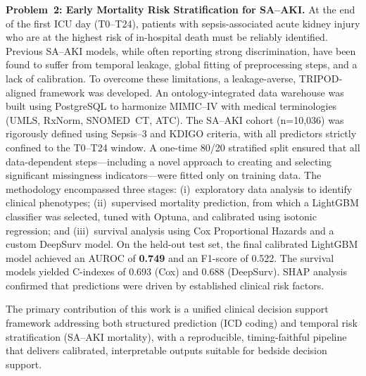 \begin{doublespacing}
\textbf{Problem~2: Early Mortality Risk Stratification for SA--AKI.} At the end of the first ICU day (T0--T24), patients with sepsis-associated acute kidney injury who are at the highest risk of in-hospital death must be reliably identified. Previous SA--AKI models, while often reporting strong discrimination, have been found to suffer from temporal leakage, global fitting of preprocessing steps, and a lack of calibration. To overcome these limitations, a leakage-averse, TRIPOD-aligned framework was developed. An ontology-integrated data warehouse was built using PostgreSQL to harmonize MIMIC--IV with medical terminologies (UMLS, RxNorm, SNOMED~CT, ATC). The SA--AKI cohort (n=10,036) was rigorously defined using Sepsis--3 and KDIGO criteria, with all predictors strictly confined to the T0--T24 window. A one-time 80/20 stratified split ensured that all data-dependent steps---including a novel approach to creating and selecting significant missingness indicators---were fitted only on training data. The methodology encompassed three stages: (i)~exploratory data analysis to identify clinical phenotypes; (ii)~supervised mortality prediction, from which a LightGBM classifier was selected, tuned with Optuna, and calibrated using isotonic regression; and (iii)~survival analysis using Cox Proportional Hazards and a custom DeepSurv model. On the held-out test set, the final calibrated LightGBM model achieved an AUROC of \textbf{0.749} and an F1-score of 0.522. The survival models yielded C-indexes of 0.693 (Cox) and 0.688 (DeepSurv). SHAP analysis confirmed that predictions were driven by established clinical risk factors.

The primary contribution of this work is a unified clinical decision support framework addressing both structured prediction (ICD coding) and temporal risk stratification (SA--AKI mortality), with a reproducible, timing-faithful pipeline that delivers calibrated, interpretable outputs suitable for bedside decision support.
\end{doublespacing}
